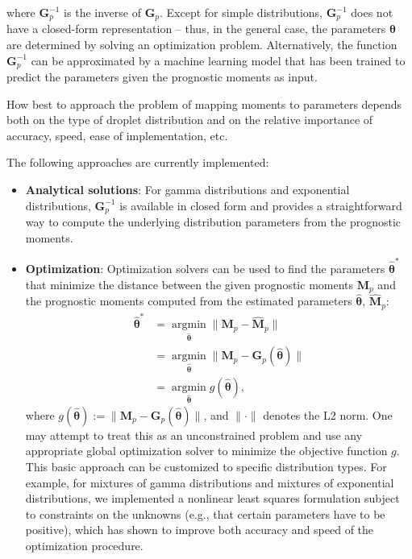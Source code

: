 \documentclass{report}
\begin{document}
\noindent where $\mathbf{G}_p^{-1}$ is the inverse of $\mathbf{G}_p$. Except for simple distributions, $\mathbf{G}_p^{-1}$ does not have a closed-form representation -- thus, in the general case, the parameters $\mathbf{\theta}$ are determined by solving an optimization
problem. Alternatively, the function $\mathbf{G}_p^{-1}$ can be approximated by a machine learning model that has been trained to predict the parameters given the prognostic moments as input.

How best to approach the problem of mapping moments to parameters depends both on the type of droplet distribution and on the relative importance of accuracy, speed, ease of implementation, etc.

The following approaches are currently implemented:
\begin{itemize}
    \item \textbf{Analytical solutions}: For gamma distributions and exponential distributions, $\mathbf{G}_p^{-1}$ is available in closed form and provides a straightforward way to compute the underlying distribution parameters from the prognostic moments.
    \item \textbf{Optimization}: Optimization solvers can be used to find the parameters $\widehat{\mathbf{\theta}}^*$ that minimize the distance between the given prognostic moments $\mathbf{M}_p$ and the prognostic moments computed from the estimated parameters $\widehat{\mathbf{\theta}}$, $\widehat{\mathbf{M}}_p$:
\begin{equation}\label{eq:Mp_to_param}
\begin{aligned}
\widehat{\mathbf{\theta}}^* &= \operatorname*{argmin}_{\widehat{\mathbf{\theta}}} \| \mathbf{M}_p - \mathbf{\widehat{M}}_p\| \\
&= \operatorname*{argmin}_{\widehat{\mathbf{\theta}}} \| \mathbf{M}_p - \mathbf{G}_p(\widehat{\mathbf{\theta}})\| \\
&= \operatorname*{argmin}_{\widehat{\mathbf{\theta}}} g(\mathbf{\widehat{\theta}}),
\end{aligned}
\end{equation}
where $g(\mathbf{\widehat{\theta}}) := \| \mathbf{M}_p - \mathbf{G}_p(\widehat{\mathbf{\theta}})\|$, and $\| \cdot \|$ denotes the L2 norm. One may attempt to treat this as an unconstrained problem and use any appropriate global optimization solver to minimize the objective function $g$. This basic approach can be customized to  specific distribution types. For example, for mixtures of gamma distributions and mixtures of exponential distributions, we implemented a nonlinear least squares formulation subject to constraints on the unknowns (e.g., that certain parameters have to be positive), which has shown to improve both accuracy and speed of the optimization procedure.
\end{itemize}
\end{document}
